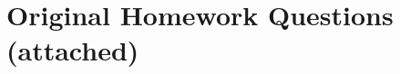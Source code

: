 \documentclass[final,3p,times]{elsarticle}
\begin{document}
\section{Original Homework Questions (attached)}
	


%
%
%
%	
%	
%
%
%
%
%
%
\end{document}
